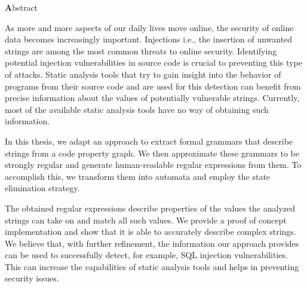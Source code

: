 \vspace*{2cm}

\begin{center}
{ \textbf Abstract}
\end{center}
\noindent

As more and more aspects of our daily lives move online, the security of online data becomes increasingly important. Injections \textendash{} i.e., the insertion of unwanted strings \textendash{} are among the most common threats to online security. Identifying potential injection vulnerabilities in source code is crucial to preventing this type of attacks. Static analysis tools that try to gain insight into the behavior of programs from their source code and are used for this detection can benefit from precise information about the values of potentially vulnerable strings. Currently, most of the available static analysis tools have no way of obtaining such information.

In this thesis, we adapt an approach to extract formal grammars that describe strings from a code property graph. 
We then approximate these grammars to be strongly regular and generate human-readable regular expressions from them. To accomplish this, we transform them into automata and employ the state elimination strategy.

The obtained regular expressions describe properties of the values the analyzed strings can take on and match all such values.
We provide a proof of concept implementation and show that it is able to accurately describe complex strings. We believe that, with further refinement, the information our approach provides can be used to successfully detect, for example, SQL injection vulnerabilities. This can increase the capabilities of static analysis tools and helps in preventing security issues.
